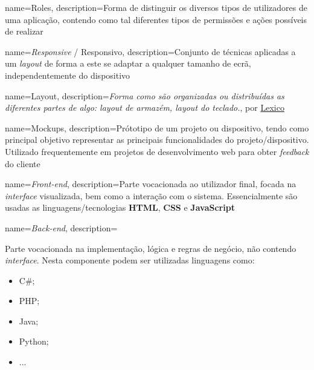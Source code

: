 








{
    name=Roles,
    description={Forma de distinguir os diversos tipos de utilizadores de uma aplicação, contendo como tal diferentes tipos de permissões e ações possíveis de realizar}
}

{
    name=\textit{Responsive} / Responsivo,
    description={Conjunto de técnicas aplicadas a um \textit{layout} de forma a este se adaptar a qualquer tamanho de ecrã, independentemente do dispositivo}
}

{
    name=Layout,
	description={\textit{Forma como são organizadas ou distribuídas as diferentes partes de algo: layout de armazém, layout do teclado.}, por \href{https://www.lexico.pt/layout/}{Lexico}}
}

{
    name=Mockups,
	description={Prótotipo de um projeto ou dispositivo, tendo como principal objetivo representar as principais funcionalidades do projeto/dispositivo. Utilizado frequentemente em projetos de desenvolvimento web para obter \textit{feedback} do cliente}
}

{
    name=\textit{Front-end},
	description={Parte vocacionada ao utilizador final, focada na \textit{interface} visualizada, bem como a interação com o sistema. Essencialmente são usadas as linguagens/tecnologias \textbf{HTML}, \textbf{CSS} e \textbf{JavaScript}}
}

{
    name=\textit{Back-end},
	description={Parte vocacionada na implementação, lógica e regras de negócio, não contendo \textit{interface}. Nesta componente podem ser utilizadas linguagens como:
	\begin{itemize}
		\item C\#;
		\item PHP;
		\item Java;
		\item Python;
		\item ...
	\end{itemize}}
}

